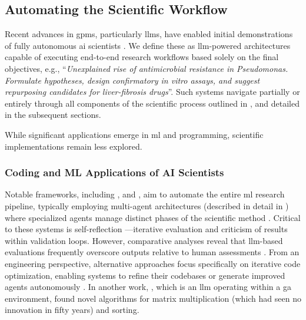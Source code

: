\subsection{Automating the Scientific Workflow} \label{sec:ai-scientists}

Recent advances in \glspl{gpm}, particularly \glspl{llm}, have enabled initial demonstrations of fully autonomous \gls{ai} scientists \autocite{schmidgall2025agent}. 
We define these as \gls{llm}-powered architectures capable of executing end-to-end research workflows based solely on the final objectives, e.g., \enquote{\textit{Unexplained rise of antimicrobial resistance in Pseudomonas. Formulate hypotheses, design confirmatory in vitro assays, and suggest repurposing candidates for liver-fibrosis drugs}}. 
Such systems navigate partially or entirely through all components of the scientific process outlined in , and detailed in the subsequent sections. 

While significant applications emerge in \gls{ml} and programming, scientific implementations remain less explored.

\subsubsection{Coding and ML Applications of AI Scientists}

Notable frameworks, including  \autocite{gottweis2025towards}, and  \autocite{yamada2025ai}, aim to automate the entire \gls{ml} research pipeline, typically employing multi-agent architectures (described in detail in ) where specialized agents manage distinct phases of the scientific method \autocite{schmidgall2025agentrxiv}. 
Critical to these systems is self-reflection \autocite{renze2024self0reflection}---iterative evaluation and criticism of results within validation loops. 
However, comparative analyses reveal that \gls{llm}-based evaluations frequently overscore outputs relative to human assessments \autocite{huang2023mlagentbench0, chan2024mle, starace2025paperbench0}. 
From an engineering perspective, alternative approaches focus specifically on iterative code optimization, enabling systems to refine their codebases \autocite{zhang2025darwin} or generate improved agents autonomously \autocite{hu2024automated}.
In another work,  \autocite{novikov2025alphaevolve}, which is an \gls{llm} operating within a \gls{ga} environment, found novel algorithms for matrix multiplication (which had seen no innovation in fifty years) and sorting.

